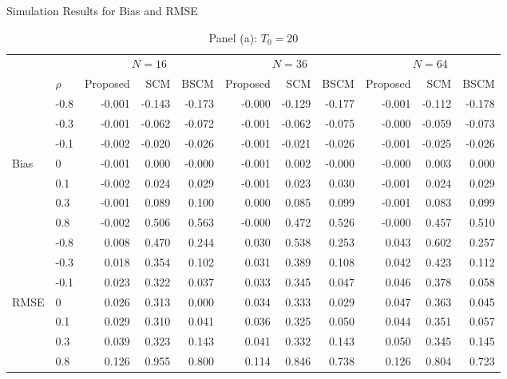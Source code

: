 \begin{table}[H]
\centering
\caption{Simulation Results for Bias and RMSE}
\label{5.2 Simulation}
\caption*{Panel (a): $T_0=20$}
\label{5.2 Simulation panel a}
\begin{tabular}{llrrrrrrrrr}
\hline
\multicolumn{2}{l}{} & 
\multicolumn{3}{c}{$N=16$} & \multicolumn{3}{c}{$N=36$} & \multicolumn{3}{c}{$N=64$}
 \\
\cmidrule(lr){3-5}\cmidrule(lr){6-8}\cmidrule(lr){9-11}


\multicolumn{1}{l}{} & \multicolumn{1}{l}{$\rho$} & 
Proposed & SCM & BSCM & Proposed & SCM & BSCM & Proposed & SCM & BSCM
 \\ \hline
 & -0.8 & -0.001 & -0.143 & -0.173 & -0.000 & -0.129 & -0.177 & -0.001 & -0.112 & -0.178 \\
& -0.3 & -0.001 & -0.062 & -0.072 & -0.001 & -0.062 & -0.075 & -0.000 & -0.059 & -0.073 \\
& -0.1 & -0.002 & -0.020 & -0.026 & -0.001 & -0.021 & -0.026 & -0.001 & -0.025 & -0.026 \\
Bias & 0 & -0.001 & 0.000 & -0.000 & -0.001 & 0.002 & -0.000 & -0.000 & 0.003 & 0.000 \\
& 0.1 & -0.002 & 0.024 & 0.029 & -0.001 & 0.023 & 0.030 & -0.001 & 0.024 & 0.029 \\
& 0.3 & -0.001 & 0.089 & 0.100 & 0.000 & 0.085 & 0.099 & -0.001 & 0.083 & 0.099 \\
& 0.8 & -0.002 & 0.506 & 0.563 & -0.000 & 0.472 & 0.526 & -0.000 & 0.457 & 0.510 \\
\hdashline
 & -0.8 & 0.008 & 0.470 & 0.244 & 0.030 & 0.538 & 0.253 & 0.043 & 0.602 & 0.257 \\
& -0.3 & 0.018 & 0.354 & 0.102 & 0.031 & 0.389 & 0.108 & 0.042 & 0.423 & 0.112 \\
& -0.1 & 0.023 & 0.322 & 0.037 & 0.033 & 0.345 & 0.047 & 0.046 & 0.378 & 0.058 \\
RMSE & 0 & 0.026 & 0.313 & 0.000 & 0.034 & 0.333 & 0.029 & 0.047 & 0.363 & 0.045 \\
& 0.1 & 0.029 & 0.310 & 0.041 & 0.036 & 0.325 & 0.050 & 0.044 & 0.351 & 0.057 \\
& 0.3 & 0.039 & 0.323 & 0.143 & 0.041 & 0.332 & 0.143 & 0.050 & 0.345 & 0.145 \\
& 0.8 & 0.126 & 0.955 & 0.800 & 0.114 & 0.846 & 0.738 & 0.126 & 0.804 & 0.723 \\
\hline
\end{tabular}

\bigskip


\end{table}
